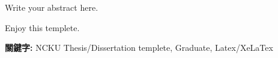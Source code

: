 \StartAbstract

Write your abstract here.

Enjoy this templete.


{\bf 關鍵字:} NCKU Thesis/Dissertation templete, Graduate, Latex/XeLaTex

\EndAbstract
